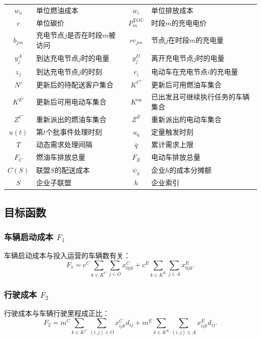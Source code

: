\begin{table}[H]
\begin{tabular*}{\linewidth}{@{\extracolsep{\fill}}cJ|cJ@{}}
$w_o$ & 单位燃油成本 & $w_c$ & 单位排放成本\\
$c$ & 单位碳价 & $P_m^{\mathrm{TOU}}$ & 时段$m$的充电电价\\
$b_{jm}$ & 充电节点$j$是否在时段$m$被访问 & $rc_{jm}$ & 节点$j$在时段$m$的充电量\\
$y_j^A$ & 到达充电节点$j$时的电量 & $y_j^D$ & 离开充电节点$j$时的电量\\
$z_j$ & 到达充电节点$j$的时刻 & $r_i$ & 电动车在充电节点$i$的充电量\\
$N'$ & 更新后的待配送客户集合 & $K^{C'}$ & 更新后可用燃油车集合\\
$K^{E'}$ & 更新后可用电动车集合 & $K^{\mathrm{on}}$ & 已出发且可继续执行任务的车辆集合\\
$Z^C$ & 重新派出的燃油车集合 & $Z^E$ & 重新派出的电动车集合\\
$u(t)$ & 第$t$个批事件处理时刻 & $u_q$ & 定量触发时刻\\
$T$ & 动态需求处理间隔 & $\bar q$ & 累计需求上限\\
$F_C$ & 燃油车排放总量 & $F_E$ & 电动车排放总量\\
$C(S)$ & 联盟$S$的配送成本 & $\psi_h$ & 企业$h$的成本分摊额\\
$S$ & 企业子联盟 & $h$ & 企业索引\\
\bottomrule
\end{tabular*}
\end{table}

\subsection{目标函数}

\subsubsection{车辆启动成本 $F_1$}

车辆启动成本与投入运营的车辆数有关\cite{ref:71}：
\begin{equation}
F_1=c^C\sum_{k\in K^C}\sum_{j\in O}x_{0jk}^C
+c^E\sum_{k\in K^E}\sum_{j\in A}x_{0jk}^E.
\label{eq:qiu-f1}
\end{equation}

\subsubsection{行驶成本 $F_2$}

行驶成本与车辆行驶里程成正比\cite{ref:71}：
\begin{equation}
F_2=m^C\sum_{k\in K^C}\sum_{(i,j)\in O}x_{ijk}^Cd_{ij}
+m^E\sum_{k\in K^E}\sum_{(i,j)\in A}x_{ijk}^Ed_{ij}.
\label{eq:qiu-f2}
\end{equation}

